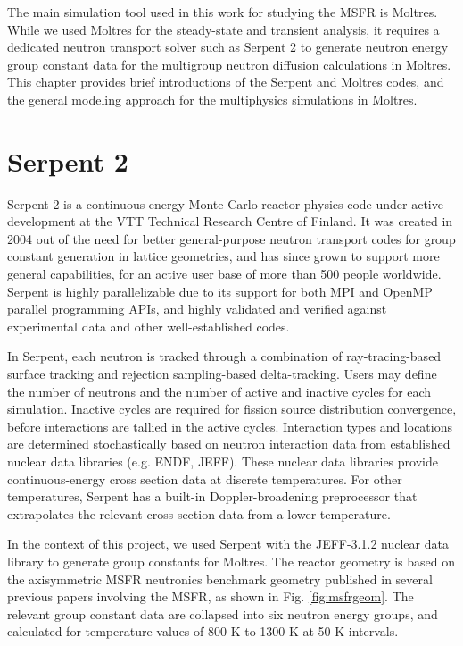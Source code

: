 The main simulation tool used in this work for studying the \gls{MSFR} is
Moltres. While we used Moltres for the steady-state and transient analysis, it
requires a dedicated neutron transport solver such as Serpent 2 to generate
neutron energy group constant data for the multigroup neutron diffusion
calculations in Moltres. This chapter provides brief introductions of the
Serpent and Moltres codes, and the general modeling approach for the
multiphysics simulations in Moltres.

\section{Serpent 2}

Serpent 2 \cite{leppanen_serpent_2014} is a continuous-energy Monte Carlo
reactor physics code under
active development at the VTT Technical Research Centre of Finland. It was
created in 2004 out of the need for better general-purpose neutron transport
codes for group constant generation in lattice geometries, and has since grown
to support more general capabilities, for an active user base of more than 500
people worldwide. Serpent is highly parallelizable due to its support for
both MPI and OpenMP parallel programming APIs, and highly validated and
verified against experimental data and other well-established codes.

In Serpent, each neutron is tracked through a combination of ray-tracing-based
surface tracking and rejection sampling-based delta-tracking. Users may define
the number of neutrons and the number of active and inactive cycles for each
simulation. Inactive cycles are required for fission source distribution
convergence, before interactions are tallied in the active cycles.
Interaction types and locations are
determined stochastically based on neutron interaction data from established
nuclear data libraries (e.g. ENDF, JEFF). These nuclear data libraries provide
continuous-energy cross section data at discrete temperatures. For other
temperatures, Serpent has a built-in Doppler-broadening preprocessor that
extrapolates the relevant cross section data from a lower temperature. 

In the context of this project, we used Serpent with the JEFF-3.1.2 nuclear
data library \cite{oecd/nea_jeff-3.1.2_2014} to generate group constants
for Moltres. The reactor geometry is based on the axisymmetric \gls{MSFR}
neutronics benchmark geometry published in several previous papers involving
the \gls{MSFR}, as shown in Fig. \ref{fig:msfrgeom}. The relevant group
constant data are collapsed into six neutron energy groups, and calculated for
temperature values of 800 K to 1300 K at 50 K intervals.

